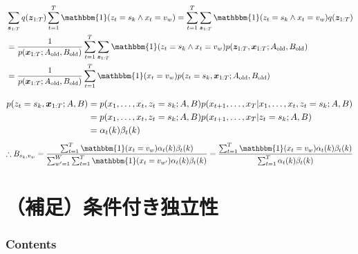\documentclass[aspectratio=169,unicode,dvipdfmx,14pt]{beamer}
\begin{document}
\begin{frame}
\FontMath
\begin{align}
& \sum_{\bm{z}_{1:T}} q(\bm{z}_{1:T}) \sum_{t=1}^T 
\mathbbm{1}( z_t = s_k \wedge x_t = v_w )
= \sum_{t=1}^T \sum_{\bm{z}_{1:T}}   
\mathbbm{1}( z_t = s_k \wedge x_t = v_w ) q(\bm{z}_{1:T})
\notag \\ &
= 
\frac{1}{p(\bm{x}_{1:T}; A_{\mbox{\scriptsize old}}, B_{\mbox{\scriptsize old}})}
\sum_{t=1}^T \sum_{\bm{z}_{1:T}}  
\mathbbm{1}( z_t = s_k \wedge x_t = v_w )
p(\bm{z}_{1:T} , \bm{x}_{1:T}; A_{\mbox{\scriptsize old}}, B_{\mbox{\scriptsize old}})
\notag \\ &
= 
\frac{1}{p(\bm{x}_{1:T}; A_{\mbox{\scriptsize old}}, B_{\mbox{\scriptsize old}})}
\sum_{t=1}^T \mathbbm{1}( x_t = v_w )
p(z_t = s_k, \bm{x}_{1:T}; A_{\mbox{\scriptsize old}}, B_{\mbox{\scriptsize old}})
\end{align}

\begin{align}
p(z_t = s_k, \bm{x}_{1:T}; A, B)
& = 
p(x_1, \ldots, x_t, z_t = s_k; A, B)
p(x_{t+1}, \ldots, x_T | x_1, \ldots, x_t, z_t = s_k; A, B)
\notag \\ & = 
p(x_1, \ldots, x_t, z_t = s_k; A, B)
p(x_{t+1}, \ldots, x_T | z_t = s_k; A, B)
\notag \\ & = 
\alpha_t(k) \beta_t(k)
\end{align}
\begin{align}
\therefore B_{s_k, v_w} 
= 
\frac{ \sum_{t=1}^T  \mathbbm{1}( x_t = v_w ) \alpha_t(k) \beta_t(k) }{ \sum_{w^\prime=1}^W \sum_{t=1}^T  \mathbbm{1}( x_t = v_{w^\prime} ) \alpha_t(k) \beta_t(k) }
= 
\frac{ \sum_{t=1}^T  \mathbbm{1}( x_t = v_w ) \alpha_t(k) \beta_t(k) }
{ \sum_{t=1}^T \alpha_t(k) \beta_t(k) }
\end{align}
\end{frame}

\section{（補足）条件付き独立性}

\begin{frame}\frametitle{Contents}
\Large \tableofcontents[currentsection]
\end{frame}
\end{document}

